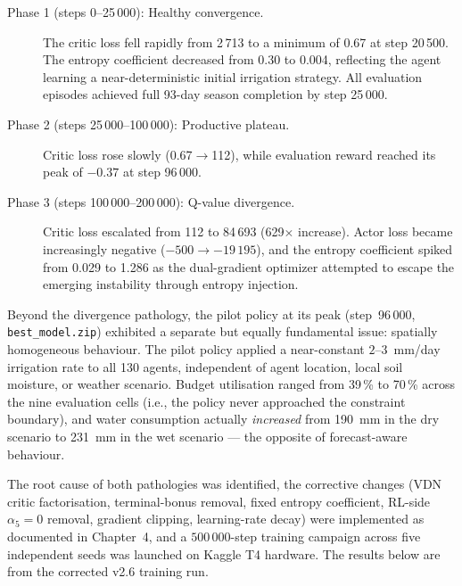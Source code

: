\begin{description}
  \item[Phase 1 (steps 0–25\,000): Healthy convergence.]
        The critic loss fell rapidly from 2\,713 to a minimum of 0.67 at step 20\,500.
        The entropy coefficient decreased from 0.30 to 0.004, reflecting the agent
        learning a near-deterministic initial irrigation strategy.
        All evaluation episodes achieved full 93-day season completion by step 25\,000.

  \item[Phase 2 (steps 25\,000–100\,000): Productive plateau.]
        Critic loss rose slowly (0.67$\to$112), while evaluation reward reached its
        peak of $-0.37$ at step 96\,000.

  \item[Phase 3 (steps 100\,000–200\,000): Q-value divergence.]
        Critic loss escalated from 112 to 84\,693 (629$\times$ increase).
        Actor loss became increasingly negative ($-500\to-19\,195$), and the entropy
        coefficient spiked from 0.029 to 1.286 as the dual-gradient optimizer
        attempted to escape the emerging instability through entropy injection.
\end{description}

Beyond the divergence pathology, the pilot policy at its peak (step~96\,000,
\texttt{best\_model.zip}) exhibited a separate but equally fundamental issue:
spatially homogeneous behaviour. The pilot policy applied a near-constant
$2$--$3$~mm/day irrigation rate to all 130 agents, independent of agent location,
local soil moisture, or weather scenario. Budget utilisation ranged from 39\,\% to
70\,\% across the nine evaluation cells (i.e., the policy never approached the
constraint boundary), and water consumption actually \emph{increased} from 190~mm in
the dry scenario to 231~mm in the wet scenario — the opposite of forecast-aware
behaviour.

The root cause of both pathologies was identified, the corrective changes (VDN critic
factorisation, terminal-bonus removal, fixed entropy coefficient, RL-side $\alpha_5
= 0$ removal, gradient clipping, learning-rate decay) were implemented as documented
in Chapter~4, and a $500\,000$-step training campaign across five independent seeds was
launched on Kaggle T4 hardware. The results below are from the corrected v2.6 training
run.


